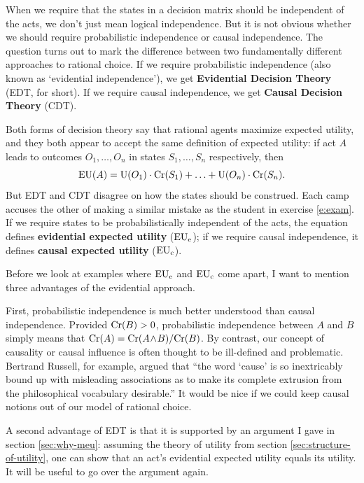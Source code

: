 When we require that the states in a decision matrix should be independent of
the acts, we don't just mean logical independence. But it is not obvious whether
we should require probabilistic independence or causal independence. The
question turns out to mark the difference between two fundamentally different
approaches to rational choice. If we require probabilistic independence (also
known as `evidential independence'), we get \textbf{Evidential Decision Theory}
(EDT, for short). If we require causal independence, we get \textbf{Causal
  Decision Theory} (CDT).


Both forms of decision theory say that rational agents maximize expected
utility, and they both appear to accept the same definition of expected utility:
if act $A$ leads to outcomes $O_1,\ldots,O_n$ in states $S_1,\ldots,S_n$
respectively, then
\[
\text{EU}(A) = \text{U}(O_1) \cdot \text{Cr}(S_1) + \ldots + \text{U}(O_n) \cdot \text{Cr}(S_n).
\]
But EDT and CDT disagree on how the states should be construed. Each camp
accuses the other of making a similar mistake as the student in exercise
\ref{e:exam}. If we require states to be probabilistically independent of the
acts, the equation defines \textbf{evidential expected utility} ($\text{EU}_\text{e}$); if we
require causal independence, it defines \textbf{causal expected utility}
($\text{EU}_\text{c}$).

Before we look at examples where $\text{EU}_\text{e}$ and $\text{EU}_\text{c}$ come apart, I
want to mention three advantages of the evidential approach.

First, probabilistic independence is much better understood than causal
independence. Provided $\text{Cr}(B) > 0$, probabilistic independence between $A$ and
$B$ simply means that $\text{Cr}(A) = \text{Cr}(A\!\land\!B)/\text{Cr}(B)$. By contrast, our concept
of causality or causal influence is often thought to be ill-defined and
problematic. Bertrand Russell, for example, argued that ``the word `cause' is so
inextricably bound up with misleading associations as to make its complete
extrusion from the philosophical vocabulary desirable.'' It would be nice if we
could keep causal notions out of our model of rational choice.

A second advantage of EDT is that it is supported by an argument I gave in
section \ref{sec:why-meu}: assuming the theory of utility from section
\ref{sec:structure-of-utility}, one can show that an act's evidential expected
utility equals its utility. It will be useful to go over the argument again.

